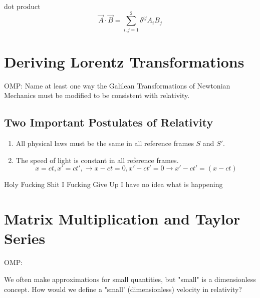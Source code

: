 \documentclass{report}
\begin{document}
dot product
\[
\vec{A} \cdot \vec{B} = \sum^2_{i, j=1} \delta^{ij}A_iB_j
\]


\chapter{Deriving Lorentz Transformations}
OMP: Name at least one way the Galilean Transformations of Newtonian Mechanics must be modified to be consistent with relativity.
\section{Two Important Postulates of Relativity}
\begin{enumerate}
\item
All physical laws must be the same in all reference frames $S$ and $S'$.
\item
The speed of light is constant in all reference frames.
\[
x=ct, x' = ct', \rightarrow x-ct = 0, x' - ct' = 0 \rightarrow x'-ct' = (x - ct)
\]

\end{enumerate}


Holy Fucking Shit I Fucking Give Up I have no idea what is happening


\chapter{Matrix Multiplication and Taylor Series}
OMP:

We often make approximations for small quantities, but "small" is a dimensionless concept. How would we define a "small' (dimensionless) velocity in relativity?
\end{document}
